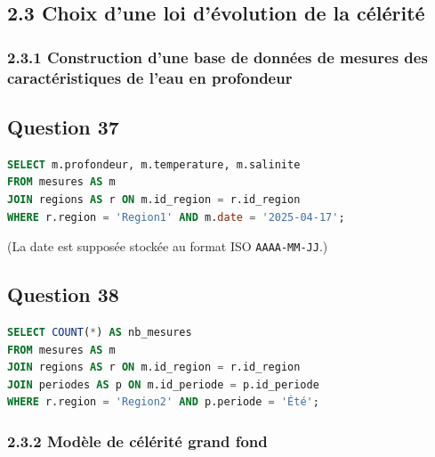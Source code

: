 \documentclass[11pt,a4paper]{article}
\begin{document}
\hypertarget{choix-dune-loi-duxe9volution-de-la-cuxe9luxe9rituxe9}{%
\subsection{2.3 Choix d'une loi d'évolution de la célérité}\label{choix-dune-loi-duxe9volution-de-la-cuxe9luxe9rituxe9}}

\hypertarget{construction-dune-base-de-donnuxe9es-de-mesures-des-caractuxe9ristiques-de-leau-en-profondeur}{%
\subsubsection{2.3.1 Construction d'une base de données de mesures des caractéristiques de l'eau en profondeur}\label{construction-dune-base-de-donnuxe9es-de-mesures-des-caractuxe9ristiques-de-leau-en-profondeur}}

\hypertarget{question-37}{%
\subsection{Question 37}\label{question-37}}

\begin{lstlisting}[language=SQL]
SELECT m.profondeur, m.temperature, m.salinite
FROM mesures AS m
JOIN regions AS r ON m.id_region = r.id_region
WHERE r.region = 'Region1' AND m.date = '2025-04-17';
\end{lstlisting}

(La date est supposée stockée au format ISO \texttt{AAAA-MM-JJ}.)

\hypertarget{question-38}{%
\subsection{Question 38}\label{question-38}}

\begin{lstlisting}[language=SQL]
SELECT COUNT(*) AS nb_mesures
FROM mesures AS m
JOIN regions AS r ON m.id_region = r.id_region
JOIN periodes AS p ON m.id_periode = p.id_periode
WHERE r.region = 'Region2' AND p.periode = 'Été';
\end{lstlisting}

\hypertarget{moduxe8le-de-cuxe9luxe9rituxe9-grand-fond}{%
\subsubsection{2.3.2 Modèle de célérité grand fond}\label{moduxe8le-de-cuxe9luxe9rituxe9-grand-fond}}
\end{document}

